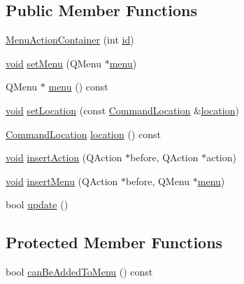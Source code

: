 \subsection*{\-Public \-Member \-Functions}
\begin{DoxyCompactItemize}
\item 
\hyperlink{group___core_plugin_gaae5e916660a2963852273a4bb2c2b2f5}{\-Menu\-Action\-Container} (int \hyperlink{group___core_plugin_ga394d3161befa5e1f84cf07253b21a536}{id})
\item 
\hyperlink{group___u_a_v_objects_plugin_ga444cf2ff3f0ecbe028adce838d373f5c}{void} \hyperlink{group___core_plugin_ga2e4053ff02b8701c2909c2e330dd4e27}{set\-Menu} (\-Q\-Menu $\ast$\hyperlink{group___core_plugin_gad2fa92d740f205ff2f12edad0b8fee36}{menu})
\item 
\-Q\-Menu $\ast$ \hyperlink{group___core_plugin_gad2fa92d740f205ff2f12edad0b8fee36}{menu} () const 
\item 
\hyperlink{group___u_a_v_objects_plugin_ga444cf2ff3f0ecbe028adce838d373f5c}{void} \hyperlink{group___core_plugin_gabbdf7e17f4d50838e08ba7f58cf59195}{set\-Location} (const \hyperlink{struct_command_location}{\-Command\-Location} \&\hyperlink{group___core_plugin_gae6c846d7bfe9fa778dd7d18bcbd69daf}{location})
\item 
\hyperlink{struct_command_location}{\-Command\-Location} \hyperlink{group___core_plugin_gae6c846d7bfe9fa778dd7d18bcbd69daf}{location} () const 
\item 
\hyperlink{group___u_a_v_objects_plugin_ga444cf2ff3f0ecbe028adce838d373f5c}{void} \hyperlink{group___core_plugin_ga8c9db6d7e64a4d62fab4346ac6f6dc8f}{insert\-Action} (\-Q\-Action $\ast$before, \-Q\-Action $\ast$action)
\item 
\hyperlink{group___u_a_v_objects_plugin_ga444cf2ff3f0ecbe028adce838d373f5c}{void} \hyperlink{group___core_plugin_ga589b7bfea67988b5a87dc94f93a905bf}{insert\-Menu} (\-Q\-Action $\ast$before, \-Q\-Menu $\ast$\hyperlink{group___core_plugin_gad2fa92d740f205ff2f12edad0b8fee36}{menu})
\item 
bool \hyperlink{group___core_plugin_gae05123001e64d02f278628c645b6b513}{update} ()
\end{DoxyCompactItemize}
\subsection*{\-Protected \-Member \-Functions}
\begin{DoxyCompactItemize}
\item 
bool \hyperlink{group___core_plugin_ga9bc589dfd5d7dea6836a3b9a628fe43a}{can\-Be\-Added\-To\-Menu} () const 
\end{DoxyCompactItemize}


